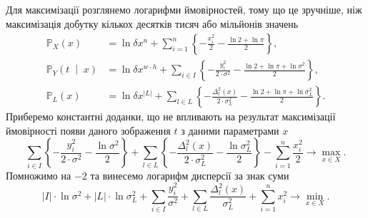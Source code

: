 Для максимізації розглянемо логарифми ймовірностей,
тому що це зручніше,
ніж максимізація добутку кількох десятків тисяч або мільйонів значень
\begin{equation*}
  \begin{split}
    \mathbb{P}_X\left( x \right)
    &= \ln{\delta x^n} +
        \sum_{i = 1}^n
        \left\{
          - \frac{x_i^2}{2}
          - \frac{\ln{2} + \ln{\pi}}{2}
        \right\}, \\
    \mathbb{P}_Y\left( t \;\middle|\; x \right)
    &= \ln{\delta x^{w \cdot h}} +
        \sum_{i \in I}
        \left\{
          - \frac{y_i^2}{2 \cdot \sigma^2}
          - \frac{\ln{2} + \ln{\pi} + \ln{\sigma^2}}{2}
        \right\}, \\
    \mathbb{P}_L\left( x \right)
    &= \ln{\delta x^{\left| L \right|}} +
        \sum_{l \in L}
        \left\{
          - \frac{\Delta_l^2\left( x \right)}{2 \cdot \sigma_L^2}
          - \frac{\ln{2} + \ln{\pi} + \ln{\sigma_L^2}}{2}
        \right\}.
  \end{split}
\end{equation*}
Приберемо константні доданки,
що не впливають на результат максимізації ймовірності
появи даного зображення $t$ з даними параметрами $x$
\begin{equation*}
  \sum_{i \in I}
    \left\{
      - \frac{y_i^2}{2 \cdot \sigma^2}
      - \frac{\ln{\sigma^2}}{2}
    \right\}
  +
  \sum_{l \in L}
    \left\{
      - \frac{\Delta_l^2\left( x \right)}{2 \cdot \sigma_L^2}
      - \frac{\ln{\sigma_L^2}}{2}
    \right\}
  - \sum_{i = 1}^n \frac{x_i^2}{2}
  \to \max\limits_{x \in X}.
\end{equation*}
Помножимо на $-2$ та винесемо логарифм дисперсії за знак суми
\begin{equation}\label{eq:minimize}
  \left| I \right| \cdot \ln{\sigma^2}
  + \left| L \right| \cdot \ln{\sigma_L^2}
  + \sum_{i \in I} \frac{ y_i^2}{\sigma^2}
  + \sum_{l \in L} \frac{ \Delta_l^2\left( x \right)}{\sigma_L^2}
  + \sum_{i = 1}^n x_i^2
  \to \min\limits_{x \in X}.
\end{equation}

